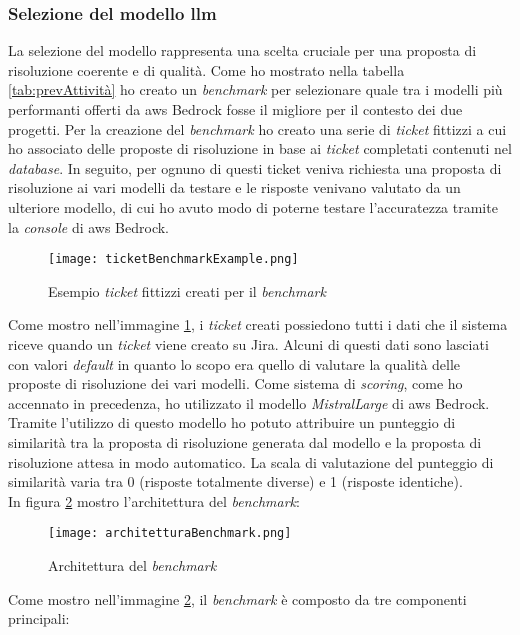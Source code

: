 \subsubsection{Selezione del modello \gls{llm}}
La selezione del modello rappresenta una scelta cruciale per una proposta di risoluzione coerente e di qualità. Come ho mostrato nella tabella \ref{tab:prevAttività} ho creato un \textit{benchmark} per selezionare quale tra i modelli più performanti offerti da \gls{aws} Bedrock fosse il migliore per il contesto dei due progetti.
Per la creazione del \textit{benchmark} ho creato una serie di \textit{ticket} fittizzi a cui ho associato delle proposte di risoluzione in base ai \textit{ticket} completati contenuti nel \textit{database}. In seguito, per ognuno di questi ticket veniva richiesta una proposta di risoluzione ai vari modelli da testare e le risposte venivano valutato da un ulteriore modello, di cui ho avuto modo di poterne testare l'accuratezza tramite la \textit{console} di \gls{aws} Bedrock.
\begin{figure}[H]
    \centering
    \texttt{[image: ticketBenchmarkExample.png]}
    \caption{Esempio \textit{ticket} fittizzi creati per il \textit{benchmark}}
    \label{fig:Ticketbenchmark}
\end{figure}
\noindent
Come mostro nell'immagine \ref{fig:Ticketbenchmark}, i \textit{ticket} creati possiedono tutti i dati che il sistema riceve quando un \textit{ticket} viene creato su Jira. Alcuni di questi dati sono lasciati con valori \textit{default} in quanto lo scopo era quello di valutare la qualità delle proposte di risoluzione dei vari modelli. 
Come sistema di \textit{scoring}, come ho accennato in precedenza, ho utilizzato il modello \textit{MistralLarge} di \gls{aws} Bedrock. Tramite l'utilizzo di questo modello ho potuto attribuire un punteggio di similarità tra la proposta di risoluzione generata dal modello e la proposta di risoluzione attesa in modo automatico. La scala di valutazione del punteggio di similarità varia tra 0 (risposte totalmente diverse) e 1 (risposte identiche). \\
In figura \ref{fig:benchmarkArchitecture} mostro l'architettura del \textit{benchmark}:
\begin{figure}[H]
    \centering
    \texttt{[image: architetturaBenchmark.png]}
    \caption{Architettura del \textit{benchmark}}
    \label{fig:benchmarkArchitecture}
\end{figure}
\noindent
Come mostro nell'immagine \ref{fig:benchmarkArchitecture}, il \textit{benchmark} è composto da tre componenti principali:
